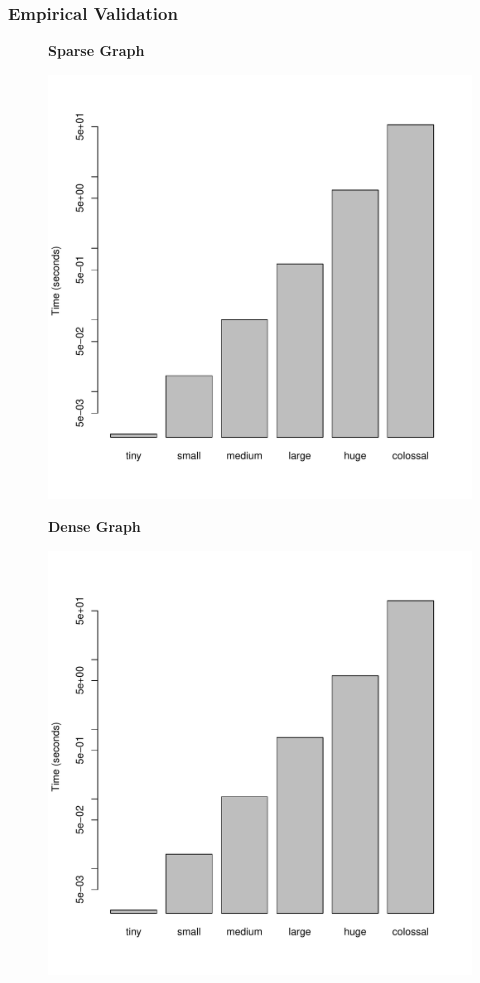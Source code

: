 \documentclass[a4paper,12pt]{article}
\begin{document}
\subsubsection{Empirical Validation}
\begin{figure}[H]
  \centering
  \textbf{Sparse Graph}\par\medskip
  \includegraphics[scale=0.3]{Floyd-Warshallsparse}
\end{figure}
\begin{figure}[H]
  \centering
  \textbf{Dense Graph}\par\medskip
  \includegraphics[scale=0.3]{Floyd-Warshalldense}
\end{figure}
\end{document}
